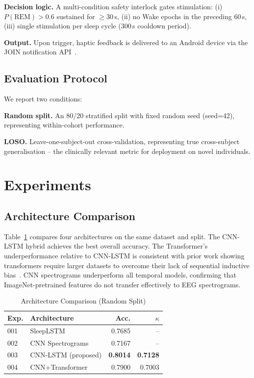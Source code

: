 \documentclass[journal]{IEEEtran}
\begin{document}
\textbf{Decision logic.}
A multi-condition safety interlock gates stimulation:
(i) $P(\text{REM}) > 0.6$ sustained for $\geq$30\,s,
(ii) no Wake epochs in the preceding 60\,s,
(iii) single stimulation per sleep cycle
(300\,s cooldown period).

\textbf{Output.}
Upon trigger, haptic feedback is delivered to
an Android device via the JOIN notification
API~\cite{join2023}.

\subsection{Evaluation Protocol}

We report two conditions:

\textbf{Random split.}
An 80/20 stratified split with fixed random seed
(seed=42), representing within-cohort performance.

\textbf{LOSO.}
Leave-one-subject-out cross-validation, representing
true cross-subject generalisation -- the clinically
relevant metric for deployment on novel individuals.

\section{Experiments}
\label{sec:experiments}

\subsection{Architecture Comparison}

Table~\ref{tab:architectures} compares four
architectures on the same dataset and split.
The CNN-LSTM hybrid achieves the best overall
accuracy.
The Transformer's underperformance relative to
CNN-LSTM is consistent with prior work showing
transformers require larger datasets to overcome
their lack of sequential inductive
bias~\cite{zeng2023}.
CNN spectrograms underperform all temporal models,
confirming that ImageNet-pretrained features do
not transfer effectively to EEG spectrograms.

\begin{table}[h]
\caption{Architecture Comparison (Random Split)}
\label{tab:architectures}
\centering
\begin{tabular}{llrr}
\toprule
Exp. & Architecture & Acc. & $\kappa$ \\
\midrule
001  & SleepLSTM            & 0.7685 & --   \\
002  & CNN Spectrograms     & 0.7167 & --   \\
003  & CNN-LSTM (proposed)  & \textbf{0.8014} & \textbf{0.7128} \\
004  & CNN+Transformer      & 0.7900 & 0.7003   \\
\bottomrule
\end{tabular}
\end{table}
\end{document}
